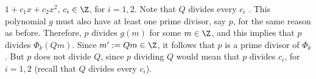 $1+c_1x+c_2x^2$, $c_i\in\Z$, for $i=1,2$. Note that $Q$ divides every $c_i$ . This polynomial $g$ must also have at least one prime divisor, say $p$, for the same reason as before. Therefore, $p$ divides $g(m)$ for some $m\in\Z$, and this implies that $p$ divides $\Phi_{{k}}(Qm)$. Since $m':=Qm\in\Z$, it follows that $p$ is a prime divisor of $\Phi_{{k}}$. But $p$ does not divide $Q$, since $p$ dividing $Q$ would mean that $p$ divides $c_i$, for $i=1,2$ (recall that $Q$ divides every $c_i$).